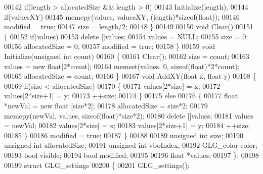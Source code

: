 \begin{DoxyCode}
00142         \textcolor{keywordflow}{if}(length > allocatedSize && length > 0)
00143             Initialize(length);
00144         \textcolor{keywordflow}{if}(valuesXY)
00145             memcpy(values, valuesXY, (length)*\textcolor{keyword}{sizeof}(\textcolor{keywordtype}{float}));
00146         modified = \textcolor{keyword}{true};
00147         size = length/2;
00148     \}
00149 
00150     \textcolor{keywordtype}{void} Clear()
00151     \{
00152         \textcolor{keywordflow}{if}(values)
00153             \textcolor{keyword}{delete} []values;
00154         values = NULL;
00155         size = 0;
00156         allocatedSize = 0;
00157         modified = \textcolor{keyword}{true};
00158     \}
00159     \textcolor{keywordtype}{void} Initialize(\textcolor{keywordtype}{unsigned} \textcolor{keywordtype}{int} count)
00160     \{
00161         Clear();
00162         size = count;
00163         values = \textcolor{keyword}{new} \textcolor{keywordtype}{float}[2*count];
00164         memset(values, 0, \textcolor{keyword}{sizeof}(\textcolor{keywordtype}{float})*2*count);
00165         allocatedSize = count;
00166     \}
00167     \textcolor{keywordtype}{void} AddXY(\textcolor{keywordtype}{float} x, \textcolor{keywordtype}{float} y)
00168     \{
00169         \textcolor{keywordflow}{if}(size < allocatedSize)
00170         \{
00171             values[2*size] = x;
00172             values[2*size+1] = y;
00173             ++size;
00174         \}
00175         \textcolor{keywordflow}{else}
00176         \{
00177             \textcolor{keywordtype}{float} *newVal = \textcolor{keyword}{new} \textcolor{keywordtype}{float} [size*2];
00178             allocatedSize = size*2;
00179             memcpy(newVal, values, \textcolor{keyword}{sizeof}(\textcolor{keywordtype}{float})*size*2);
00180             \textcolor{keyword}{delete} []values;
00181             values = newVal;
00182             values[2*size] = x;
00183             values[2*size+1] = y;
00184             ++size;
00185         \}
00186         modified = \textcolor{keyword}{true};
00187     \}
00188 
00189     \textcolor{keywordtype}{unsigned} \textcolor{keywordtype}{int} size;
00190     \textcolor{keywordtype}{unsigned} \textcolor{keywordtype}{int} allocatedSize;
00191     \textcolor{keywordtype}{unsigned} \textcolor{keywordtype}{int} vboIndex;
00192     GLG_color color;
00193     \textcolor{keywordtype}{bool} visible;
00194     \textcolor{keywordtype}{bool} modified;
00195 
00196     \textcolor{keywordtype}{float} *values;
00197 \};
00198 
00199 \textcolor{keyword}{struct }GLG_settings
00200 \{
00201     GLG_settings();

\end{DoxyCode}
